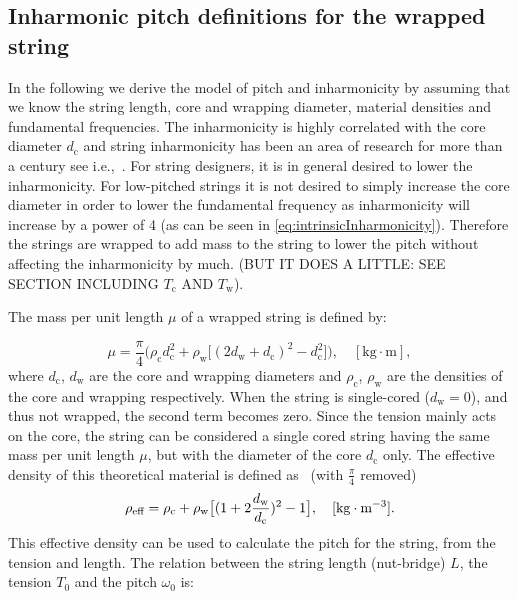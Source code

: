 \documentclass{article}
\begin{document}
\begin{sloppy}
\subsection{Inharmonic pitch definitions for the wrapped string %
}

In the following we derive the model of pitch and inharmonicity by assuming that we know the string length, core and wrapping diameter,  material densities and fundamental frequencies. The inharmonicity is highly correlated with the core diameter $d_\text{c}$ and string inharmonicity has been an area of research for more than a century see i.e.,~\cite{rayleigh:sound}. For string designers, it is in general desired to lower the inharmonicity. For low-pitched strings it is not desired to simply increase the core diameter in order to lower the fundamental frequency as inharmonicity will increase by a power of 4 (as can be seen in \eqref{eq:intrinsicInharmonicity}). Therefore the strings are wrapped to add mass to the string to lower the pitch without affecting the inharmonicity by much. (BUT IT DOES A LITTLE: SEE SECTION INCLUDING $T_\text{c}$ AND $T_\text{w}$).

\noindent The mass per unit length $\mu$ of a wrapped string is defined by:

\begin{equation}
    \mu = \frac{\pi}{4}\Big(\rho_\text{c}d_\text{c}^2 + \rho_\text{w}\big[(2d_\text{w}+d_\text{c})^2-d_\text{c}^2\big]\Big), \quad [\text{kg}\cdot\text{m}],
\end{equation}
where $d_\text{c}$, $d_\text{w}$ are the core and wrapping diameters and $\rho_\text{c}$, $\rho_\text{w}$ are the densities of the core and wrapping respectively. When the string is single-cored ($d_\text{w} = 0$), and thus not wrapped, the second term becomes zero. Since the tension mainly acts on the core, the string can be considered a single cored string having the same mass per unit length $\mu$, but with the diameter of the core $d_\text{c}$ only. The effective density of this theoretical material is defined as~\cite{firth:string_design} (with $\frac{\pi}{4}$ removed)
\begin{equation}
    \rho_{\textup{eff}} = \rho_\text{c} + \rho_\text{w} \big[(1+2\frac{d_\text{w}}{d_\text{c}})^2-1\big], \quad [\text{kg}\cdot\text{m}^{-3}].
\end{equation}
This effective density can be used to calculate the pitch for the string, from the tension and length. The relation between the string length (nut-bridge) $L$, the tension $T_0$ and the pitch $\omega_0$ is:


\end{sloppy}
\end{document}
